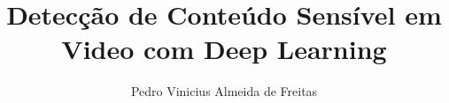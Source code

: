 \documentclass[phd,american]{ThesisPUC}
\author{Pedro Vinicius Almeida de Freitas}
\title{Detecção de Conteúdo Sensível em Video com Deep Learning}
\begin{document}








\arial


\normalfont
\appendix



\end{document}
